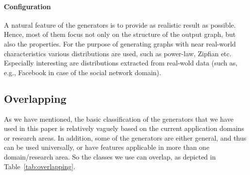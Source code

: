 \paragraph{Configuration}
A natural feature of the generators is to provide as realistic result as possible. Hence, most of them focus not only on the structure of the output graph, but also the properties. For the purpose of generating graphs with near real-world characteristics various distributions are used, such as power-law, Zipfian etc. Especially interesting are distributions extracted from real-wold data (such as, e.g., Facebook in case of the social network domain).

\subsection{Overlapping}
\label{sec:overlapping}

As we have mentioned, the basic classification of the generators that we have used in this paper is relatively vaguely based on the current application domains or research areas. In addition, some of the generators are either general, and thus can be used universally, or have features applicable in more than one domain/research area. So the classes we use can overlap, as depicted in Table~\ref{tab:overlapping}.

